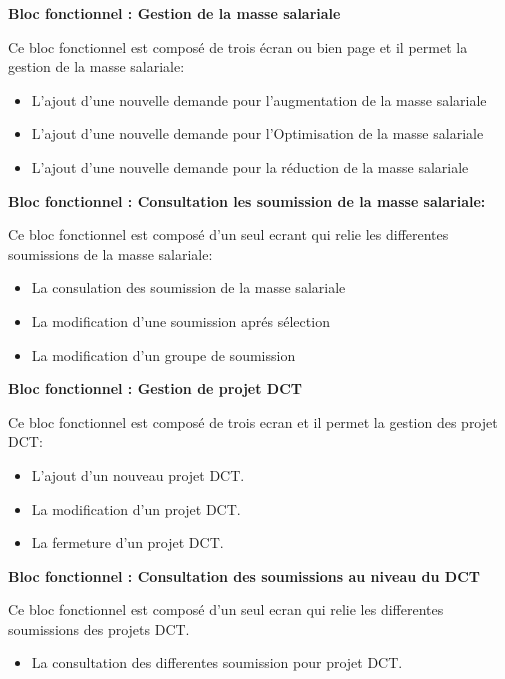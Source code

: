 \textbf{\color{red}Bloc fonctionnel : Gestion de la masse salariale}
    
Ce bloc fonctionnel est composé de trois écran ou bien page et il permet la gestion de la masse salariale:
\\
\begin{itemize}
    \item L'ajout d'une nouvelle demande pour l'augmentation de la masse salariale 
    \item L'ajout d'une nouvelle demande pour l'Optimisation de la masse salariale 
    \item L'ajout d'une nouvelle demande pour la réduction de la masse salariale 
\end{itemize}

\vspace{0.5cm}
\textbf{\color{red}Bloc fonctionnel : Consultation les soumission de la masse salariale:}
    
Ce bloc fonctionnel est composé d'un seul ecrant qui relie les differentes soumissions de la masse salariale:
\\
\begin{itemize}
    \item La consulation des soumission de la masse salariale
    \item La modification d'une soumission aprés sélection
    \item La modification d'un groupe de soumission
\end{itemize}

\newpage
\textbf{\color{red}Bloc fonctionnel : Gestion de projet DCT}
    
Ce bloc fonctionnel est composé de trois ecran et il permet la gestion des projet DCT: 
\\
\begin{itemize}
    \item L'ajout d'un nouveau projet DCT.
    \item La modification d'un projet DCT.
    \item La fermeture d'un projet DCT.
\end{itemize}

\vspace{0.5cm}
\textbf{\color{red}Bloc fonctionnel : Consultation des soumissions au niveau du DCT}
    
Ce bloc fonctionnel est composé d'un seul ecran qui relie les differentes soumissions des projets DCT.
\begin{itemize}
    \item La consultation des differentes soumission pour projet DCT.
\end{itemize}

